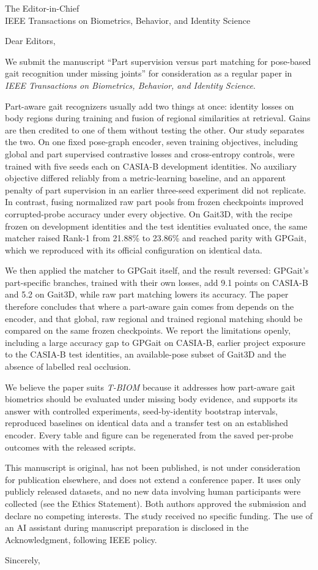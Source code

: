 \documentclass[11pt]{letter}
\date{\today}
\begin{document}
\begin{letter}{The Editor-in-Chief\\IEEE Transactions on Biometrics, Behavior, and Identity Science}
\opening{Dear Editors,}

We submit the manuscript ``Part supervision versus part matching for
pose-based gait recognition under missing joints'' for consideration as a
regular paper in \emph{IEEE Transactions on Biometrics, Behavior, and Identity
Science}.

Part-aware gait recognizers usually add two things at once: identity losses on
body regions during training and fusion of regional similarities at
retrieval. Gains are then credited to one of them without testing the other.
Our study separates the two. On one fixed pose-graph encoder, seven training
objectives, including global and part supervised contrastive losses and
cross-entropy controls, were trained with five seeds each on CASIA-B
development identities. No auxiliary objective differed reliably from a
metric-learning baseline, and an apparent penalty of part supervision in an
earlier three-seed experiment did not replicate. In contrast, fusing normalized
raw part pools from frozen checkpoints improved corrupted-probe accuracy under
every objective. On Gait3D, with the recipe frozen on development identities
and the test identities evaluated once, the same matcher raised Rank-1 from
21.88\% to 23.86\% and reached parity with GPGait, which we reproduced with its
official configuration on identical data.

We then applied the matcher to GPGait itself, and the result reversed: GPGait's
part-specific branches, trained with their own losses, add 9.1 points on
CASIA-B and 5.2 on Gait3D, while raw part matching lowers its accuracy. The
paper therefore concludes that where a part-aware gain comes from depends on
the encoder, and that global, raw regional and trained regional matching should
be compared on the same frozen checkpoints. We report the limitations openly,
including a large accuracy gap to GPGait on CASIA-B, earlier project exposure to
the CASIA-B test identities, an available-pose subset of Gait3D and the absence
of labelled real occlusion.

We believe the paper suits \emph{T-BIOM} because it addresses how part-aware
gait biometrics should be evaluated under missing body evidence, and supports
its answer with controlled experiments, seed-by-identity bootstrap intervals,
reproduced baselines on identical data and a transfer test on an established
encoder. Every table and
figure can be regenerated from the saved per-probe outcomes with the released
scripts.

This manuscript is original, has not been published, is not under
consideration for publication elsewhere, and does not extend a conference
paper. It uses only publicly released datasets, and no new data involving human
participants were collected (see the Ethics Statement). Both authors approved the submission
and declare no competing interests. The study received no specific funding.
The use of an AI assistant during manuscript preparation is disclosed in the
Acknowledgment, following IEEE policy.

\closing{Sincerely,}
\end{letter}
\end{document}

